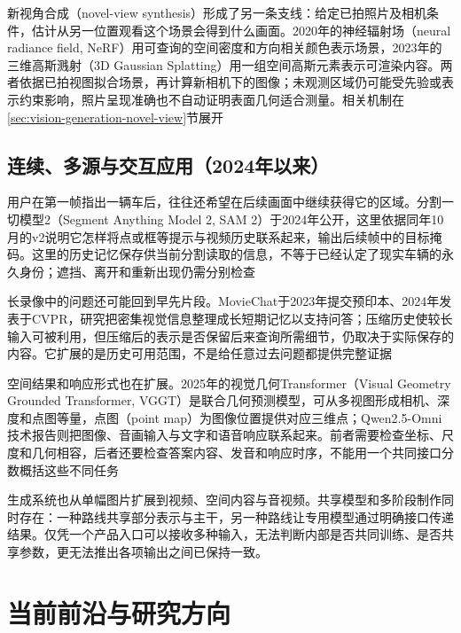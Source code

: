 新视角合成（novel-view synthesis）形成了另一条支线：给定已拍照片及相机条件，估计从另一位置观看这个场景会得到什么画面。2020年的神经辐射场（neural radiance field, NeRF）用可查询的空间密度和方向相关颜色表示场景，2023年的三维高斯溅射（3D Gaussian Splatting）用一组空间高斯元素表示可渲染内容。两者依据已拍视图拟合场景，再计算新相机下的图像；未观测区域仍可能受先验或表示约束影响，照片呈现准确也不自动证明表面几何适合测量。相关机制在\ref{sec:vision-generation-novel-view}节展开

\subsection{连续、多源与交互应用（2024年以来）}
\label{sec:vision-overview-continuous-history}

用户在第一帧指出一辆车后，往往还希望在后续画面中继续获得它的区域。分割一切模型2（Segment Anything Model 2, SAM 2）于2024年公开，这里依据同年10月的v2说明它怎样将点或框等提示与视频历史联系起来，输出后续帧中的目标掩码。这里的历史记忆保存供当前分割读取的信息，不等于已经认定了现实车辆的永久身份；遮挡、离开和重新出现仍需分别检查

长录像中的问题还可能回到早先片段。MovieChat于2023年提交预印本、2024年发表于CVPR，研究把密集视觉信息整理成长短期记忆以支持问答；压缩历史使较长输入可被利用，但压缩后的表示是否保留后来查询所需细节，仍取决于实际保存的内容。它扩展的是历史可用范围，不是给任意过去问题都提供完整证据

空间结果和响应形式也在扩展。2025年的视觉几何Transformer（Visual Geometry Grounded Transformer, VGGT）是联合几何预测模型，可从多视图形成相机、深度和点图等量，点图（point map）为图像位置提供对应三维点；Qwen2.5-Omni技术报告则把图像、音画输入与文字和语音响应联系起来。前者需要检查坐标、尺度和几何相容，后者还要检查答案内容、发音和响应时序，不能用一个共同接口分数概括这些不同任务

生成系统也从单幅图片扩展到视频、空间内容与音视频。共享模型和多阶段制作同时存在：一种路线共享部分表示与主干，另一种路线让专用模型通过明确接口传递结果。仅凭一个产品入口可以接收多种输入，无法判断内部是否共同训练、是否共享参数，更无法推出各项输出之间已保持一致。

\section{当前前沿与研究方向}
\label{sec:vision-overview-frontiers}

